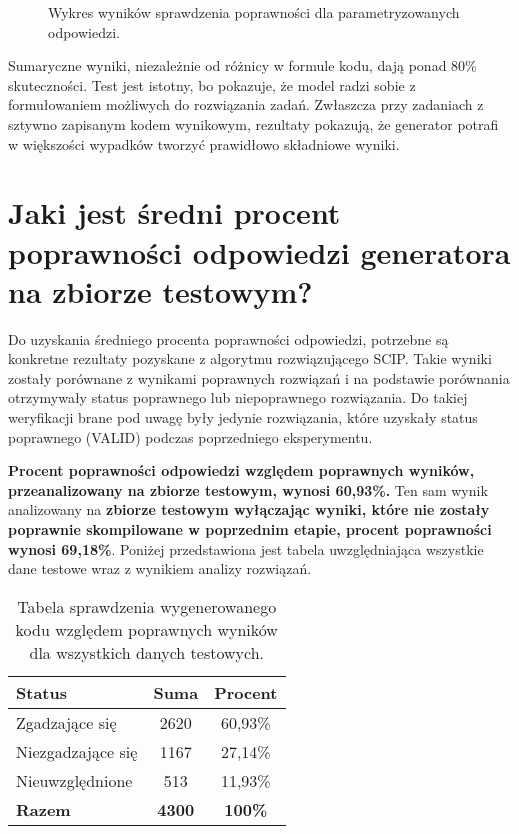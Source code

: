 \begin{figure}[H]
\centering
{}
\caption{Wykres wyników sprawdzenia poprawności dla parametryzowanych odpowiedzi.}\label{rys:plama2c}
\end{figure}

Sumaryczne wyniki, niezależnie od różnicy w formule kodu, dają ponad 80\% skuteczności. Test jest istotny, bo pokazuje, że model radzi sobie z formułowaniem możliwych do rozwiązania zadań. Zwłaszcza przy zadaniach z sztywno zapisanym kodem wynikowym, rezultaty pokazują, że generator potrafi w większości wypadków tworzyć prawidłowo składniowe wyniki.

\section{Jaki jest średni procent poprawności odpowiedzi generatora na zbiorze testowym?}

Do uzyskania średniego procenta poprawności odpowiedzi, potrzebne są konkretne rezultaty pozyskane z algorytmu rozwiązującego SCIP. Takie wyniki zostały porównane z wynikami poprawnych rozwiązań i na podstawie porównania otrzymywały status poprawnego lub niepoprawnego rozwiązania. Do takiej weryfikacji brane pod uwagę były jedynie rozwiązania, które uzyskały status poprawnego (VALID) podczas poprzedniego eksperymentu.

\textbf{Procent poprawności odpowiedzi względem poprawnych wyników, przeanalizowany na zbiorze testowym, wynosi 60,93\%.} Ten sam wynik analizowany na \textbf{zbiorze testowym wyłączając wyniki, które nie zostały poprawnie skompilowane w poprzednim etapie, procent poprawności wynosi 69,18\%}. Poniżej przedstawiona jest tabela uwzględniająca wszystkie dane testowe wraz z wynikiem analizy rozwiązań.

\begin{table}[ht]
\caption{Tabela sprawdzenia wygenerowanego kodu względem poprawnych wyników dla wszystkich danych testowych.}\label{tab:tabela4}
\centering%
\begin{tabular}{|l|c|c|}
\hline
\textbf{Status} & \textbf{Suma} & \textbf{Procent} \\
\hline
Zgadzające się & 2620 & 60,93\% \\
\hline
Niezgadzające się & 1167 & 27,14\% \\
\hline
Nieuwzględnione & 513 & 11,93\% \\
\hline
\textbf{Razem} & \textbf{4300} & \textbf{100\%} \\
\hline
\end{tabular}
\end{table}


